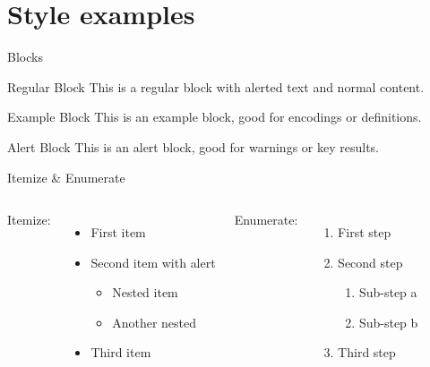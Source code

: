 
\section{Style examples}

\begin{frame}{Blocks}

  \begin{block}{Regular Block}
    This is a regular block with \alert{alerted text} and normal content.
  \end{block}

  \begin{exampleblock}{Example Block}
    This is an example block, good for encodings or definitions.
  \end{exampleblock}

  \begin{alertblock}{Alert Block}
    This is an alert block, good for warnings or key results.
  \end{alertblock}

\end{frame}

\begin{frame}{Itemize \& Enumerate}

  \begin{columns}
      Itemize:
      \begin{itemize}
        \item First item
        \item Second item with \alert{alert}
          \begin{itemize}
            \item Nested item
            \item Another nested
          \end{itemize}
        \item Third item
      \end{itemize}

      Enumerate:
      \begin{enumerate}
        \item First step
        \item Second step
          \begin{enumerate}
            \item Sub-step a
            \item Sub-step b
          \end{enumerate}
        \item Third step
      \end{enumerate}
  \end{columns}

\end{frame}

